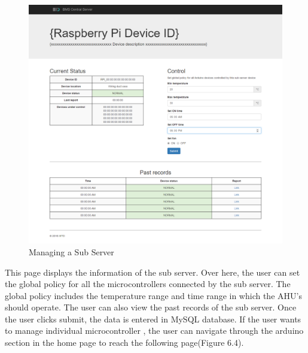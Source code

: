 \documentclass[letterpaper,11pt]{report}
\begin{document}
\begin{figure}[h]
\includegraphics[width=\textwidth]{raspberrypi}
\centering
\captionsetup{justification=centering}
\caption{Managing a Sub Server}
\label{fig:raspberrypi}
\end{figure}

This page displays the information of the sub server. Over here, the user can set the global policy for all the microcontrollers connected by the sub server. The global policy includes the temperature range and time range in which the AHU’s should operate. The user can also view the past records of the sub server.
\newpage
Once the user clicks submit, the data is entered in MySQL database.
\newpage
If the user wants to manage individual microcontroller , the user can navigate through the arduino section in the home page to reach the following page(Figure 6.4).
\end{document}
